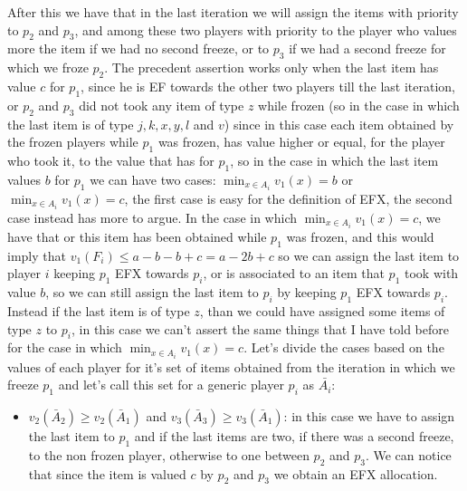 \begin{itemize}
After this we have that in the last iteration we will assign the items with priority to $p_2$ and $p_3$, and among these two players with priority to the player who values more the item if we had no second freeze, or to $p_3$ if we had a second freeze for which we froze $p_2$. The precedent assertion works only when the last item has value $c$ for $p_1$, since he is EF towards the other two players till the last iteration, or $p_2$ and $p_3$ did not took any item of type $z$ while frozen (so in the case in which the last item is of type $j, k, x, y, l$ and $v$) since in this case each item obtained by the frozen players while $p_1$ was frozen, has value higher or equal, for the player who took it, to the value that has for $p_1$, so in the case in which the last item values $b$ for $p_1$ we can have two cases: $\min_{x\in A_i} v_1(x) = b$ or $\min_{x\in A_i} v_1(x) = c$, the first case is easy for the definition of EFX, the second case instead has more to argue. In the case in which  $\min_{x\in A_i} v_1(x) = c$, we have that or this item has been obtained while $p_1$ was frozen, and this would imply that $v_1(F_i) \le a - b - b + c = a-2b+c$ so we can assign the last item to player $i$ keeping $p_1$ EFX towards $p_i$, or is associated to an item that $p_1$ took with value $b$, so we can still assign the last item to $p_i$ by keeping $p_1$ EFX towards $p_i$. Instead if the last item is of type $z$, than we could have assigned some items of type $z$ to $p_i$, in this case we can't assert the same things that I have told before for the case in which $\min_{x\in A_i} v_1(x) = c$.  Let's divide the cases based on the values of each player for it's set of items obtained from the iteration in which we freeze $p_1$ and let's call this set for a generic player $p_i$ as $\bar{A_i}$: 
\begin{itemize}
    \item $v_2(\bar A_2) \ge v_2(\bar A_1)$ and $v_3(\bar A_3) \ge v_3(\bar A_1)$: in this case we have to assign the last item to $p_1$ and if the last items are two, if there was a second freeze, to the non frozen player, otherwise to one between $p_2$ and $p_3$. We can notice that since the item is valued $c$ by $p_2$ and $p_3$ we obtain an EFX allocation.

\end{itemize}
\end{itemize}
